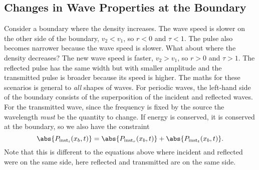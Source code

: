 \documentclass[../classical_mechanics.tex]{subfiles}
\begin{document}
        \subsection{Changes in Wave Properties at the Boundary}\label{subsec:changes-in-wave-properties-at-the-boundary}
            Consider a boundary where the density increases.
            The wave speed is slower on the other side of the boundary, $v_2<v_1$, so $r<0$ and $\tau<1$.
            The pulse also becomes narrower because the wave speed is slower.
            What about where the density decreases?
            The new wave speed is faster, $v_2>v_1$, so $r>0$ and $\tau>1$.
            The reflected pulse has the same width but with smaller amplitude and the transmitted pulse is broader because its speed is higher.
            The maths for these scenarios is general to \textit{all} shapes of waves.
            For periodic waves, the left-hand side of the boundary consists of the superposition of the incident and reflected waves.
            For the transmitted wave, since the frequency is fixed by the source the wavelength \textit{must} be the quantity to change.
            If energy is conserved, it is conserved at the boundary, so we also have the constraint
            \begin{equation}
                \abs{P_{\text{inst}_i}(x_b,t)}=\abs{P_{\text{inst}_r}(x_b,t)}+\abs{P_{\text{inst}_t}(x_b,t)}.
            \end{equation}
            Note that this is different to the equations above where incident and reflected were on the same side, here reflected and transmitted are on the same side.
\end{document}
